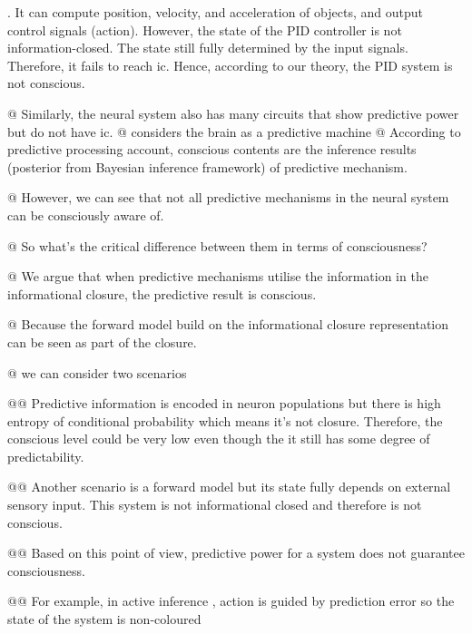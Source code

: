 \documentclass[utf8]{article}
\begin{document}
\begin{WritingMaterials}
    		. It can compute position, velocity, and acceleration of objects, and output control signals (action). However, the state of the PID controller is not information-closed. The state still fully determined by the input signals. Therefore, it fails to reach \ac{ic}. Hence, according to our theory, the PID system is not conscious.
    
    		@ Similarly, the neural system also has many circuits that show predictive power but do not have \ac{ic}.
    		@ considers the brain as a predictive machine
    		@ According to predictive processing account, conscious contents are the inference results (posterior from Bayesian inference framework) of predictive mechanism.
    
    		@ However, we can see that not all predictive mechanisms in the neural system can be consciously aware of.
    
    		@ So what's the critical difference between them in terms of consciousness?
    
    		@ We argue that when predictive mechanisms utilise the information in the informational closure, the predictive result is conscious.
    
    		@ Because the forward model build on the informational closure representation can be seen as part of the closure. 
    
    
    		@ we can consider two scenarios
    
    			@@ Predictive information is encoded in neuron populations but there is high entropy of conditional probability which means it's not closure. Therefore, the conscious level could be very low even though the it still has some degree of predictability.
    
    			@@ Another scenario is a forward model but its state fully depends on external sensory input. This system is not informational closed and therefore is not conscious.
    
    			@@ Based on this point of view, predictive power for a system does not guarantee consciousness.
    
    			@@ For example, in active inference , action is guided by prediction error so the state of the system is non-coloured
	\end{WritingMaterials}

        
        
\end{document}
